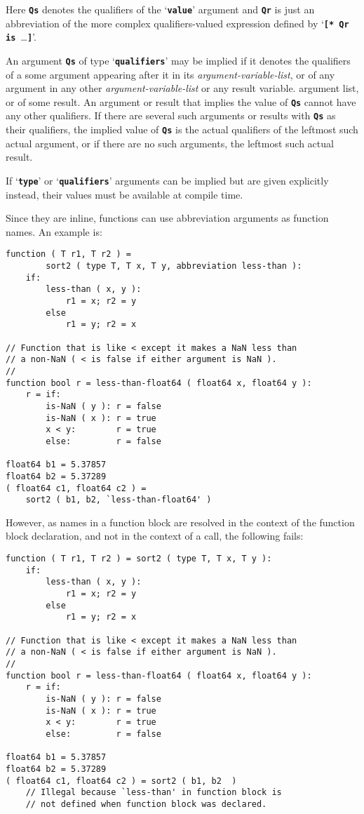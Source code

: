 \documentclass[12pt]{article}
\newcommand{\TT}[1]{{\tt \bfseries #1}}
\newenvironment{indpar}[1][0.3in]%
	{\begin{list}{}%
		     {\setlength{\itemsep}{0in}%
		      \setlength{\topsep}{0in}%
		      \setlength{\parsep}{1ex}%
		      \setlength{\labelwidth}{#1}%
		      \setlength{\leftmargin}{#1}%
		      \addtolength{\leftmargin}{\labelsep}}%
	 \item}%
	{\end{list}}
\begin{document}
Here \TT{Qs} denotes the qualifiers of the `\TT{value}' argument
and \TT{Qr} is just an abbreviation of the more complex
qualifiers-valued expression defined by `\TT{[* Qr is~}\ldots\TT{*]}'.

An argument \TT{Qs} of type `\TT{qualifiers}' may be implied if it
denotes the qualifiers of a some argument appearing
after it in its {\em argument-variable-list},
or of any argument in any other {\em argument-variable-list}
or any result variable.
argument list, or of some result.
An argument or result that implies the value of \TT{Qs}
cannot have any other qualifiers.
If there are several such arguments or results with \TT{Qs}
as their qualifiers,
the implied value of \TT{Qs} is the actual qualifiers of the leftmost such
actual argument, or if there are no such arguments,
the leftmost such actual result.

If `\TT{type}' or `\TT{qualifiers}' arguments can be implied
but are given explicitly instead, their values must be available
at compile time.

Since they are inline, functions can use abbreviation arguments as function
names.  An example is:
\begin{indpar}\begin{verbatim}
function ( T r1, T r2 ) =
        sort2 ( type T, T x, T y, abbreviation less-than ):
    if:
        less-than ( x, y ):
            r1 = x; r2 = y
        else
            r1 = y; r2 = x

// Function that is like < except it makes a NaN less than
// a non-NaN ( < is false if either argument is NaN ).
//
function bool r = less-than-float64 ( float64 x, float64 y ):
    r = if:
        is-NaN ( y ): r = false
        is-NaN ( x ): r = true
        x < y:        r = true
        else:         r = false

float64 b1 = 5.37857
float64 b2 = 5.37289
( float64 c1, float64 c2 ) =
    sort2 ( b1, b2, `less-than-float64' )
\end{verbatim}\end{indpar}

However, as names in a function block are resolved in the context
of the function block declaration, and not in the context of a
call, the following fails:
\begin{indpar}\begin{verbatim}
function ( T r1, T r2 ) = sort2 ( type T, T x, T y ):
    if:
        less-than ( x, y ):
            r1 = x; r2 = y
        else
            r1 = y; r2 = x

// Function that is like < except it makes a NaN less than
// a non-NaN ( < is false if either argument is NaN ).
//
function bool r = less-than-float64 ( float64 x, float64 y ):
    r = if:
        is-NaN ( y ): r = false
        is-NaN ( x ): r = true
        x < y:        r = true
        else:         r = false

float64 b1 = 5.37857
float64 b2 = 5.37289
( float64 c1, float64 c2 ) = sort2 ( b1, b2  )
    // Illegal because `less-than' in function block is
    // not defined when function block was declared.
\end{verbatim}\end{indpar}
\end{document}
